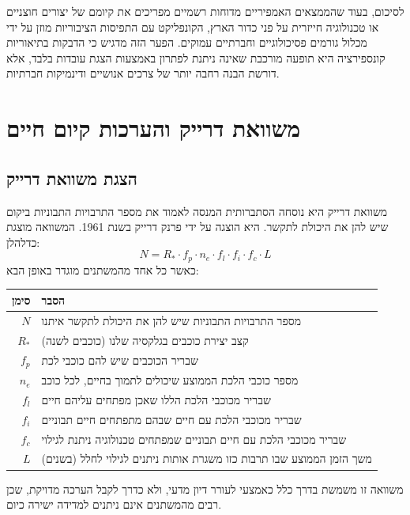 \documentclass[12pt,a4paper]{article}
\begin{document}
לסיכום, בעוד שהממצאים האמפיריים מדוחות רשמיים מפריכים את קיומם של יצורים חוצניים או טכנולוגיה חייזרית על פני כדור הארץ, הקונפליקט עם התפיסות הציבוריות מוזן על ידי מכלול גורמים פסיכולוגיים וחברתיים עמוקים. הפער הזה מדגיש כי הדבקות בתיאוריות קונספירציה היא תופעה מורכבת שאינה ניתנת לפתרון באמצעות הצגת עובדות בלבד, אלא דורשת הבנה רחבה יותר של צרכים אנושיים ודינמיקות חברתיות.

\section{משוואת דרייק והערכות קיום חיים}
\label{chap:drake_equation_extended}

\subsection{הצגת משוואת דרייק}
\label{sec:drake_equation_intro}

משוואת דרייק היא נוסחה הסתברותית המנסה לאמוד את מספר התרבויות התבוניות ביקום שיש להן את היכולת לתקשר. היא הוצגה על ידי פרנק דרייק בשנת 1961. המשוואה מוצגת כדלהלן:
\begin{equation}
    N = R_* \cdot f_p \cdot n_e \cdot f_l \cdot f_i \cdot f_c \cdot L
    \label{eq:drake}
\end{equation}
כאשר כל אחד מהמשתנים מוגדר באופן הבא:
\begin{center}
\begin{tabular}{|r|l|}
\hline
\textbf{סימן} & \textbf{הסבר} \\
\hline
$N$ & מספר התרבויות התבוניות שיש להן את היכולת לתקשר איתנו \\
$R_*$ & קצב יצירת כוכבים בגלקסיה שלנו (כוכבים לשנה) \\
$f_p$ & שבריר הכוכבים שיש להם כוכבי לכת \\
$n_e$ & מספר כוכבי הלכת הממוצע שיכולים לתמוך בחיים, לכל כוכב \\
$f_l$ & שבריר מכוכבי הלכת הללו שאכן מפתחים עליהם חיים \\
$f_i$ & שבריר מכוכבי הלכת עם חיים שבהם מתפתחים חיים תבוניים \\
$f_c$ & שבריר מכוכבי הלכת עם חיים תבוניים שמפתחים טכנולוגיה ניתנת לגילוי \\
$L$ & משך הזמן הממוצע שבו תרבות כזו משגרת אותות ניתנים לגילוי לחלל (בשנים) \\
\hline
\end{tabular}
\end{center}
משוואה זו משמשת בדרך כלל כאמצעי לעורר דיון מדעי, ולא כדרך לקבל הערכה מדויקת, שכן רבים מהמשתנים אינם ניתנים למדידה ישירה כיום.
\end{document}
